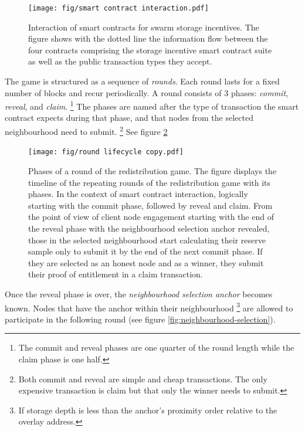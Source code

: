 \begin{figure}[!ht]
  \centering
     \texttt{[image: fig/smart contract interaction.pdf]}
  \caption[Interaction of smart contracts for swarm storage incentives]{Interaction of smart contracts for swarm storage incentives. The figure shows with the dotted line the information flow between the four contracts comprising the storage incentive smart contract suite as well as the public transaction types they accept. }
\label{fig:smart-contracts}
\end{figure}    

The game is structured as a sequence of \emph{rounds}. Each round lasts for a fixed number of blocks and recur periodically. A round consists of 3 phases: \emph{commit}, \emph{reveal}, and \emph{claim}.%
%
\footnote{The commit and reveal phases are one quarter of the round length while the claim phase is one half.
}
%
The phases are named after the type of transaction the smart contract expects during that phase, and that nodes from the selected neighbourhood need to submit.%
%
\footnote{Both commit and reveal are simple and cheap transactions. The only expensive transaction is claim but that only the winner needs to submit.}
%
See figure \ref{fig:phases}

\begin{figure}[!ht]
  \centering
    \texttt{[image: fig/round lifecycle copy.pdf]}
  \caption[Phases of a round of the redistribution game]{Phases of a round of the redistribution game. The figure displays the timeline of the repeating rounds of the redistribution game with its phases. In the context of smart contract interaction, logically starting with the commit phase, followed by reveal and claim. From the point of view of client node engagement starting with the end of the reveal phase with the neighbourhood selection anchor revealed, those in the selected neighbourhood start calculating their reserve sample only to submit it by the end of the next commit phase. If they are selected as an honest node and as a winner, they submit their proof of entitlement in a claim transaction.}
\label{fig:phases}
\end{figure}    

Once the reveal phase is over, the  \emph{neighbourhood selection anchor} becomes known. Nodes that have the anchor within their neighbourhood%
%
\footnote{If storage depth is less than the anchor's proximity order relative to the overlay address.}
%
are  allowed to participate in the following round (see figure \ref{fig:neighbourhood-selection}).



